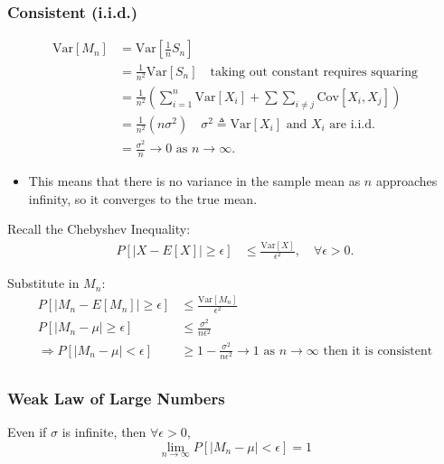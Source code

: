\subsubsection{Consistent (i.i.d.)}
\begin{derivation}
    \begin{align*}
        \text{Var}[M_n] &= \text{Var}\left[\frac{1}{n} S_n\right] \\
        &= \frac{1}{n^2} \text{Var}[S_n] \quad \text{taking out constant requires squaring}\\
        &= \frac{1}{n^2} \left(\sum_{i=1}^n \text{Var}[X_i] + \sum \sum_{i \neq j} \text{Cov}[X_i, X_j]\right) \\
        &= \frac{1}{n^2} (n \sigma^2) \quad \sigma^2 \triangleq \text{Var}[X_i] \text{ and $X_i$ are i.i.d.} \\
        &= \frac{\sigma^2}{n} \to 0 \text{ as } n \to \infty.
    \end{align*}
    \begin{itemize}
        \item This means that there is no variance in the sample mean as $n$ approaches infinity, so it converges to the true mean.
    \end{itemize}
    \vspace{1em}

    Recall the Chebyshev Inequality:
    \begin{align*}
        P\left[|X - E[X]| \geq \epsilon\right] &\leq \frac{\text{Var}[X]}{\epsilon^2}, \quad \forall \epsilon > 0.
    \end{align*}

    Substitute in $M_n$:
    \begin{align*}
        P\left[|M_n - E[M_n]| \geq \epsilon\right] &\leq \frac{\text{Var}[M_n]}{\epsilon^2} \\
        P\left[|M_n - \mu| \geq \epsilon\right] &\leq \frac{\sigma^2}{n \epsilon^2} \\
        \Rightarrow P\left[|M_n - \mu| < \epsilon\right] &\geq 1 - \frac{\sigma^2}{n \epsilon^2} \to 1 \text{ as } n \to \infty \text{ then it is consistent} \\
    \end{align*}
\end{derivation}

\subsubsection{Weak Law of Large Numbers}
\begin{definition}
    Even if $\sigma$ is infinite, then $\forall \epsilon > 0$, 
    \begin{equation*}
        \lim_{n \to \infty} P\left[|M_n - \mu| < \epsilon\right] = 1
    \end{equation*}
\end{definition}

